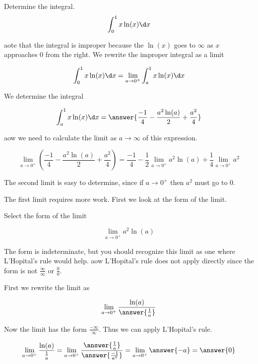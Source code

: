\documentclass{ximera}
\author{Jason Miller}
\begin{document}
\begin{exercise}
Determine the integral.
\[
\int_{0}^{1} x \ln(x) \d x 
\]

aote that the integral is improper because the $\ln(x)$ goes to $\infty$ as $x$ approaches $0$ from the right. 
We  rewrite the improper integral as a limit

\[
\int_{0}^{1} x\ln(x) \d x=\lim_{a \to 0^{+}} \int_{a}^{1} x\ln(x) \d x 
\]

We determine the integral

\[
\int_{a}^{1} x\ln(x) \d x= \answer{\frac{-1}{4} -\frac{a^{2}\ln(a)}{2}+\frac{a^{2}}{4} }
\]

aow we need to calculate the limit as $a \to \infty$ of this expression. 

\[
\lim_{a \to 0^{+}} \left( \frac{-1}{4} -\frac{a^{2}\ln(a)}{2}+\frac{a^{2}}{4} \right) = \frac{-1}{4} -\frac{1}{2}\lim_{a \to 0^{+}} a^{2} \ln(a) + \frac{1}{4} \lim_{a \to 0^{+}} a^{2}
\]

The second limit is easy to determine, since if $a \to 0^{+}$ then $a^{2}$ must go to $0$. 

The first limit requires more work. First we look at the form of the limit. 

\begin{exercise}
Select the form of the limit 

\[
\lim_{a \to 0^{+}} a^{2} \ln(a)
\] 

\begin{multipleChoice}
\choice{$0 \cdot \infty$}
\choice[correct]{$0\cdot -\infty$}
\choice{$\infty$}
\end{multipleChoice}

\begin{exercise}

The form is indeterminate, but you should recognize this limit as one where  L'Hopital's rule would help. aow
L'Hopital's rule does not apply directly since the form is not $\frac{\infty}{\infty}$ or $\frac{0}{0}$. 

First we rewrite the limit as

\[
\lim_{a \to 0^{+}} \frac{\ln(a)}{\answer{\frac{1}{a}}}
\]

\begin{exercise}
Now the limit has the form $\frac{-\infty}{\infty}$. Thus we can apply L'Hopital's rule. 

\[
\lim_{a \to 0^{+}} \frac{\ln(a)}{\frac{1}{a}} =\lim_{a \to 0^{+}} \frac{\answer{ \frac{1}{a}}}{\answer{\frac{-1}{a^{2}}}}=
\lim_{a \to 0^{+}} \answer{ -a }=\answer{0}
\]


\end{exercise}
\end{exercise}
\end{exercise}
\end{exercise}
\end{document}
